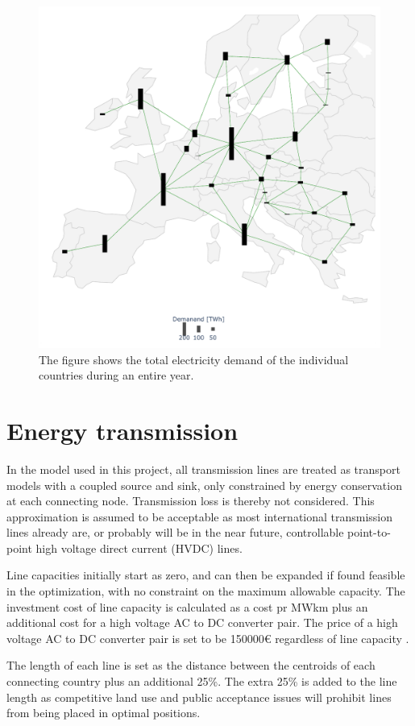 \begin{figure}[h]\center 
	\includegraphics[width=.8\textwidth]{./Images/Demand}
	\caption{The figure shows the total electricity demand of the individual countries during an entire year. }
	\label{fig:demand}
\end{figure}

\section{Energy transmission}
In the model used in this project, all transmission lines are treated as transport models with a coupled source and sink, only constrained by energy conservation at each connecting node. Transmission loss is thereby not considered. This approximation is assumed to be acceptable as most international transmission lines already are, or probably will be in the near future, controllable point-to-point high voltage direct current (HVDC) lines. 

Line capacities initially start as zero, and can then be expanded if found feasible in the optimization, with no constraint on the maximum allowable capacity. The investment cost of line capacity is calculated as a cost pr MWkm plus an additional cost for a high voltage AC to DC converter pair. The price of a high voltage AC to DC converter pair is set to be 150000€ regardless of line capacity \cite{HAGSPIEL2014654}. 

The length of each line is set as the distance between the centroids of each connecting country plus an additional 25\%. The extra 25\% is added to the line length as competitive land use and public acceptance issues will prohibit lines from being placed in optimal positions. 

